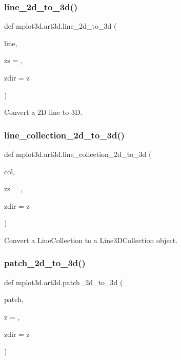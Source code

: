 \subsubsection{\texorpdfstring{line\+\_\+2d\+\_\+to\+\_\+3d()}{line\_2d\_to\_3d()}}
{\footnotesize\ttfamily def mplot3d.\+art3d.\+line\+\_\+2d\+\_\+to\+\_\+3d (\begin{DoxyParamCaption}\item[{}]{line,  }\item[{}]{zs = {},  }\item[{}]{zdir = {\ttfamily \textquotesingle{}z\textquotesingle{}} }\end{DoxyParamCaption})}

\begin{DoxyVerb}Convert a 2D line to 3D.\end{DoxyVerb}
 \mbox{\label{namespacemplot3d_1_1art3d_a1d140cd224fc1c70909b879baf17eac2}} 
\subsubsection{\texorpdfstring{line\+\_\+collection\+\_\+2d\+\_\+to\+\_\+3d()}{line\_collection\_2d\_to\_3d()}}
{\footnotesize\ttfamily def mplot3d.\+art3d.\+line\+\_\+collection\+\_\+2d\+\_\+to\+\_\+3d (\begin{DoxyParamCaption}\item[{}]{col,  }\item[{}]{zs = {},  }\item[{}]{zdir = {\ttfamily \textquotesingle{}z\textquotesingle{}} }\end{DoxyParamCaption})}

\begin{DoxyVerb}Convert a LineCollection to a Line3DCollection object.\end{DoxyVerb}
 \mbox{\label{namespacemplot3d_1_1art3d_aaa3aaa8baa36dfff3aed3f84dc126aa5}} 
\subsubsection{\texorpdfstring{patch\+\_\+2d\+\_\+to\+\_\+3d()}{patch\_2d\_to\_3d()}}
{\footnotesize\ttfamily def mplot3d.\+art3d.\+patch\+\_\+2d\+\_\+to\+\_\+3d (\begin{DoxyParamCaption}\item[{}]{patch,  }\item[{}]{z = {},  }\item[{}]{zdir = {\ttfamily \textquotesingle{}z\textquotesingle{}} }\end{DoxyParamCaption})}

